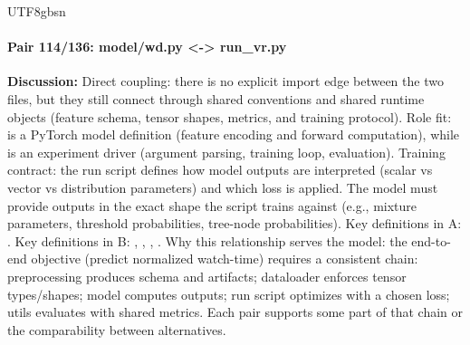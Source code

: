 \documentclass[11pt]{article}
\begin{document}
\begin{CJK*}{UTF8}{gbsn}
\paragraph{Pair 114/136: model/wd.py <-> run\_vr.py}
\textbf{Discussion:} Direct coupling: there is no explicit import edge between the two files, but they still connect through shared conventions and shared runtime objects (feature schema, tensor shapes, metrics, and training protocol). Role fit: \texttt{} is a PyTorch model definition (feature encoding and forward computation), while \texttt{} is an experiment driver (argument parsing, training loop, evaluation). Training contract: the run script defines how model outputs are interpreted (scalar vs vector vs distribution parameters) and which loss is applied. The model must provide outputs in the exact shape the script trains against (e.g., mixture parameters, threshold probabilities, tree-node probabilities). Key definitions in A: \texttt{}. Key definitions in B: \texttt{}, \texttt{}, \texttt{}, \texttt{}. Why this relationship serves the model: the end-to-end objective (predict normalized watch-time) requires a consistent chain: preprocessing produces schema and artifacts; dataloader enforces tensor types/shapes; model computes outputs; run script optimizes with a chosen loss; utils evaluates with shared metrics. Each pair supports some part of that chain or the comparability between alternatives.


\end{CJK*}
\end{document}
